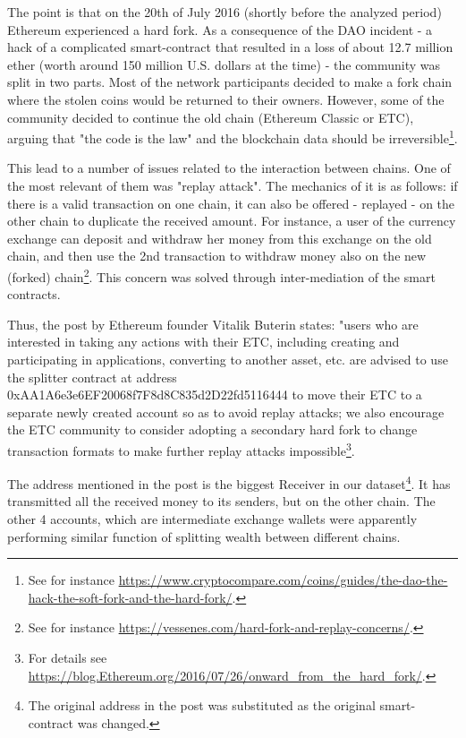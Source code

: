 The point is that on the 20th of July 2016 (shortly before the analyzed period) Ethereum experienced a hard fork.
As a consequence of the DAO incident - a hack of a complicated smart-contract that resulted in a loss of about 12.7 million ether (worth around 150 million U.S. dollars at the time) - the community was split in two parts.
Most of the network participants decided to make a fork chain where the stolen coins would be returned to their owners.
However, some of the community decided to continue the old chain (Ethereum Classic or ETC), arguing that "the code is the law" and the blockchain data should be irreversible\footnote{See for instance \url{https://www.cryptocompare.com/coins/guides/the-dao-the-hack-the-soft-fork-and-the-hard-fork/}.}.

This lead to a number of issues related to the interaction between chains.
One of the most relevant of them was "replay attack".
The mechanics of it is as follows:
if there is a valid transaction on one chain, it can also be offered - replayed - on the other chain to duplicate the received amount.
For instance, a user of the currency exchange can deposit and withdraw her money from this exchange on the old chain, and then use the 2nd transaction to withdraw money also on the new (forked) chain\footnote{See for instance \url{https://vessenes.com/hard-fork-and-replay-concerns/}.}.
This concern was solved through inter-mediation of the smart contracts.

Thus, the post by Ethereum founder Vitalik Buterin states:
"users who are interested in taking any actions with their ETC, including creating and participating in applications, converting to another asset, etc. are advised to use the splitter contract at address 0xAA1A6e3e6EF20068f7F8d8C835d2D22fd5116444 to move their ETC to a separate newly created account so as to avoid replay attacks; we also encourage the ETC community to consider adopting a secondary hard fork to change transaction formats to make further replay attacks impossible\footnote{For details see \url{https://blog.Ethereum.org/2016/07/26/onward\_from\_the\_hard\_fork/}.}.

The address mentioned in the post is the biggest Receiver in our dataset\footnote{The original address in the post was substituted as the original smart-contract was changed.}.
It has transmitted all the received money to its senders, but on the other chain.
The other 4 accounts, which are intermediate exchange wallets were apparently performing similar function of splitting wealth between different chains.

